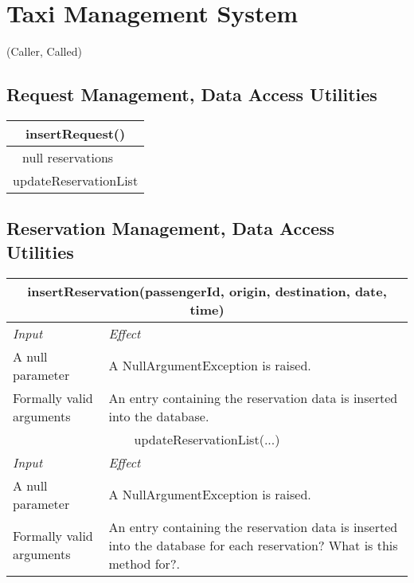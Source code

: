 \documentclass[11pt,oneside,a4paper]{report}
\newcommand{\method}[1]{\multicolumn{2}{|c|}{{#1}}\\\hline
	\textit{Input} & \textit{Effect} \\\hline}
\begin{document}
\chapter{Taxi Management System}
{\Huge (Caller, Called)}
\section{Request Management, Data Access Utilities}
\begin{tabular}{|c|c|}
\hline
\multicolumn{2}{c}{insertRequest()}\\\hline\hline
null
reservations & \\\hline
\multicolumn{2}{c}{updateReservationList}\\\hline
\end{tabular}


\section{Reservation Management, Data Access Utilities}
\begin{table}[ph]
\centering
\begin{tabular}{|p{5cm}|p{6cm}|}
	\hline
	\method{insertReservation(passengerId, origin, destination, date, time)}
	A null parameter &
	A NullArgumentException is raised.\\\hline
	Formally valid arguments &
	An entry containing the reservation data is inserted into the database.\\\hline\hline
	
	\method{updateReservationList(...)}
	A null parameter &
	A NullArgumentException is raised. \\\hline
	Formally valid arguments &
	An entry containing the reservation data is inserted into the database for each reservation? What is this method for?.\\\hline
\end{tabular}
\end{table}
\end{document}
